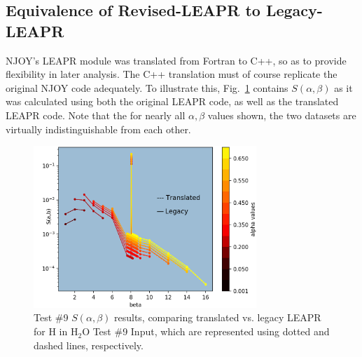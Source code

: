 \documentclass[Master.tex]{subfiles}
\begin{document}
  \subsection{Equivalence of Revised-LEAPR to Legacy-LEAPR}
    NJOY's LEAPR module was translated from Fortran to C++, so as to provide flexibility in later analysis. The C++ translation must of course replicate the original NJOY code adequately. To illustrate this, Fig.~\ref{fig:me_vs_njoy_sab} contains $S(\alpha,\beta)$ as it was calculated using both the original LEAPR code, as well as the translated LEAPR code. Note that the for nearly all $\alpha,\beta$ values shown, the two datasets are virtually indistinguishable from each other. 
    \begin{figure}[H]
      \begin{center}
        \includegraphics[width=0.75\textwidth]{images/me-vs-njoy-1b}
        \caption[Comparison of Translated vs. Legacy LEAPR, for Test \#9 ($S(\alpha,\beta)$)]{Test \#9 $S(\alpha,\beta)$ results, comparing translated vs. legacy LEAPR for H in H$_2$O Test \#9 Input, which are represented using dotted and dashed lines, respectively.}
        \label{fig:me_vs_njoy_sab}
      \end{center}
    \end{figure}
\end{document}
